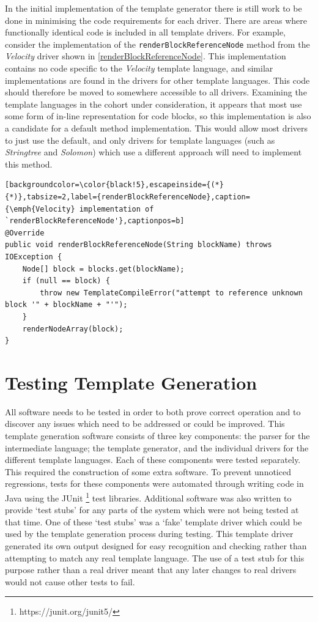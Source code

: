 In the initial implementation of the template generator there is still work to be done in minimising the code requirements for each driver. There are areas where functionally identical code is included in all template drivers. For example, consider the implementation of the \verb!renderBlockReferenceNode! method from the \emph{Velocity} driver shown in \autoref{renderBlockReferenceNode}. This implementation contains no code specific to the \emph{Velocity} template language, and similar implementations are found in the drivers for other template languages. This code should therefore be moved to somewhere accessible to all drivers. Examining the template languages in the cohort under consideration, it appears that most use some form of in-line representation for code blocks, so this implementation is also a candidate for a default method implementation. This would allow most drivers to just use the default, and only drivers for template languages (such as \emph{Stringtree} and \emph{Solomon}) which use a different approach will need to implement this method.

\begin{lstlisting}[backgroundcolor=\color{black!5},escapeinside={(*}{*)},tabsize=2,label={renderBlockReferenceNode},caption={\emph{Velocity} implementation of `renderBlockReferenceNode'},captionpos=b]
@Override
public void renderBlockReferenceNode(String blockName) throws IOException {
    Node[] block = blocks.get(blockName);
    if (null == block) {
        throw new TemplateCompileError("attempt to reference unknown block '" + blockName + "'");
    }
    renderNodeArray(block);
}
\end{lstlisting}

\section*{Testing Template Generation}

All software needs to be tested in order to both prove correct operation and to discover any issues which need to be addressed or could be improved. This template generation software consists of three key components: the parser for the intermediate language; the template generator, and the individual drivers for the different template languages. Each of these components were tested separately. This required the construction of some extra software. To prevent unnoticed regressions, tests for these components were automated through writing code in Java using the JUnit \footnote{https://junit.org/junit5/} test libraries. Additional software was also written to provide `test stubs' for any parts of the system which were not being tested at that time. One of these `test stubs' was a `fake' template driver which could be used by the template generation process during testing. This template driver generated its own output designed for easy recognition and checking rather than attempting to match any real template language. The use of a test stub for this purpose rather than a real driver meant that any later changes to real drivers would not cause other tests to fail.

